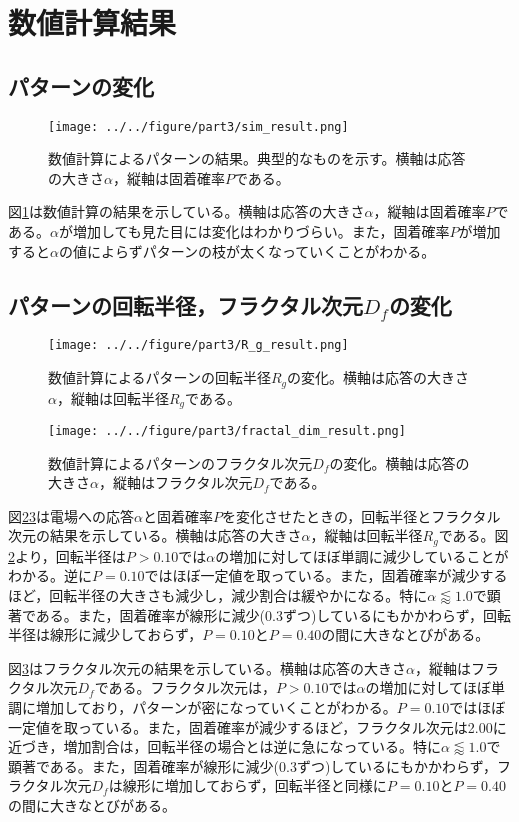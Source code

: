 \documentclass[autodetect-engine,dvi=dvipdfmx,a4paper,ja=standard,oneside,openany,11pt,draft]{bxjsbook}
\begin{document}
\section{数値計算結果}
\subsection{パターンの変化}
\begin{figure}[htbp]
  \centering
  \texttt{[image: ../../figure/part3/sim\_result.png]}
  \caption{数値計算によるパターンの結果。典型的なものを示す。横軸は応答の大きさ$\alpha$，縦軸は固着確率$P$である。}
  \label{fig:sim_result}
\end{figure}
図\ref{fig:sim_result}は数値計算の結果を示している。横軸は応答の大きさ$\alpha$，縦軸は固着確率$P$である。$\alpha$が増加しても見た目には変化はわかりづらい。また，固着確率$P$が増加すると$\alpha$の値によらずパターンの枝が太くなっていくことがわかる。
\subsection{パターンの回転半径，フラクタル次元$D_f$の変化}
\begin{figure}[htbp]
  \centering
  \texttt{[image: ../../figure/part3/R\_g\_result.png]}
  \caption{数値計算によるパターンの回転半径$R_g$の変化。横軸は応答の大きさ$\alpha$，縦軸は回転半径$R_g$である。}
  \label{fig:R_g_result}
\end{figure}
\begin{figure}
  \centering
  \texttt{[image: ../../figure/part3/fractal\_dim\_result.png]}
  \caption{数値計算によるパターンのフラクタル次元$D_f$の変化。横軸は応答の大きさ$\alpha$，縦軸はフラクタル次元$D_f$である。}
  \label{fig:fractal_dim_result}
\end{figure}
図\ref{fig:R_g_result}\ref{fig:fractal_dim_result}は電場への応答$\alpha$と固着確率$P$を変化させたときの，回転半径とフラクタル次元の結果を示している。横軸は応答の大きさ$\alpha$，縦軸は回転半径$R_g$である。図\ref{fig:R_g_result}より，回転半径は$P>0.10$では$\alpha$の増加に対してほぼ単調に減少していることがわかる。逆に$P=0.10$ではほぼ一定値を取っている。また，固着確率が減少するほど，回転半径の大きさも減少し，減少割合は緩やかになる。特に$\alpha\lessapprox1.0$で顕著である。また，固着確率が線形に減少(0.3ずつ)しているにもかかわらず，回転半径は線形に減少しておらず，$P=0.10$と$P=0.40$の間に大きなとびがある。

図\ref{fig:fractal_dim_result}はフラクタル次元の結果を示している。横軸は応答の大きさ$\alpha$，縦軸はフラクタル次元$D_f$である。フラクタル次元は，$P>0.10$では$\alpha$の増加に対してほぼ単調に増加しており，パターンが密になっていくことがわかる。$P=0.10$ではほぼ一定値を取っている。また，固着確率が減少するほど，フラクタル次元は2.00に近づき，増加割合は，回転半径の場合とは逆に急になっている。特に$\alpha\lessapprox1.0$で顕著である。また，固着確率が線形に減少(0.3ずつ)しているにもかかわらず，フラクタル次元$D_f$は線形に増加しておらず，回転半径と同様に$P=0.10$と$P=0.40$の間に大きなとびがある。
\ifdraft{
  
  
}{}
\end{document}
